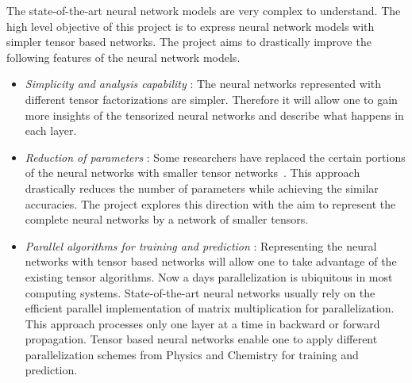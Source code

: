 
The state-of-the-art neural network models are very complex to understand. The high level objective of this project is to express neural network models with simpler tensor based networks. 
The \prname project aims to drastically improve the following features of the neural network models.
\begin{itemize}
	\item \emph{Simplicity and analysis capability} : The neural networks represented with different tensor factorizations are simpler. Therefore it will allow one to gain more insights of the tensorized neural networks and describe what happens in each layer.
	\item \emph{Reduction of parameters} : Some researchers have replaced the certain portions of the neural networks with smaller tensor networks~\cite{bibid}. This approach drastically reduces the number of parameters while achieving the similar accuracies. The \prname project explores this direction with the aim to represent the complete neural networks by a network of smaller tensors. 
	\item \emph{Parallel algorithms for training and prediction} : Representing the neural networks with tensor based networks will allow one to take advantage of the existing tensor algorithms. Now a days parallelization is ubiquitous in most computing systems. State-of-the-art neural networks usually rely on the efficient parallel implementation of matrix multiplication for parallelization. This approach processes only one layer at a time in backward or forward propagation. Tensor based neural networks enable one to apply different parallelization schemes from Physics and Chemistry for training and prediction.
\end{itemize}


